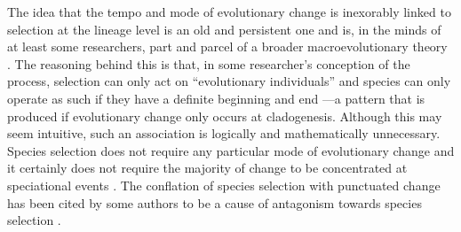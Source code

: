 The idea that the tempo and mode of evolutionary change is inexorably linked to selection at the lineage level is an old and persistent one and is, in the minds of at least some researchers, part and parcel of a broader macroevolutionary theory \citep{Stanley1975, Stanley1979, GouldEldredge1977, Gould1980, Charlesworth1982, Dennett1995, Levinton2001, Gould2002}. The reasoning behind this is that, in some researcher's conception of the process, selection can only act on ``evolutionary individuals'' \citep{Hull1980} and species can only operate as such if they have a definite beginning and end \citep{GouldEldredge1977, Gould2002}---a pattern that is produced if evolutionary change only occurs at cladogenesis. Although this may seem intuitive, such an association is logically and mathematically unnecessary. Species selection does not require any particular mode of evolutionary change and it certainly does not require the majority of change to be concentrated at speciational events \citep{VanValen1975, Bookstein1978, Slatkin1981, ArnoldFristrup1982, Rice1995, McShea2004, Rice2004, Okasha2006, Jablonski2008, Simpson2013}. The conflation of species selection with punctuated change has been cited by some authors to be a cause of antagonism towards species selection \citep{Turner2010, FitzJohnthesis}.


